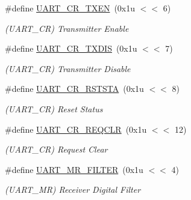 \begin{DoxyCompactItemize}
\#define \mbox{\hyperlink{group__SAMS70__UART_ga8a305762b980c740221e6ead8d8aee87}{U\+A\+R\+T\+\_\+\+C\+R\+\_\+\+T\+X\+EN}}~(0x1u $<$$<$ 6)
\begin{DoxyCompactList}\small\item\em (U\+A\+R\+T\+\_\+\+CR) Transmitter Enable \end{DoxyCompactList}\item 
\mbox{\label{group__SAMS70__UART_gab822b68f656ad659006963366cd63ce1}} 
\#define \mbox{\hyperlink{group__SAMS70__UART_gab822b68f656ad659006963366cd63ce1}{U\+A\+R\+T\+\_\+\+C\+R\+\_\+\+T\+X\+D\+IS}}~(0x1u $<$$<$ 7)
\begin{DoxyCompactList}\small\item\em (U\+A\+R\+T\+\_\+\+CR) Transmitter Disable \end{DoxyCompactList}\item 
\mbox{\label{group__SAMS70__UART_gac3208ecbd03dcec5be5637b0b4e117ab}} 
\#define \mbox{\hyperlink{group__SAMS70__UART_gac3208ecbd03dcec5be5637b0b4e117ab}{U\+A\+R\+T\+\_\+\+C\+R\+\_\+\+R\+S\+T\+S\+TA}}~(0x1u $<$$<$ 8)
\begin{DoxyCompactList}\small\item\em (U\+A\+R\+T\+\_\+\+CR) Reset Status \end{DoxyCompactList}\item 
\mbox{\label{group__SAMS70__UART_gabed6a9339fd23c51f4a9c5106433db94}} 
\#define \mbox{\hyperlink{group__SAMS70__UART_gabed6a9339fd23c51f4a9c5106433db94}{U\+A\+R\+T\+\_\+\+C\+R\+\_\+\+R\+E\+Q\+C\+LR}}~(0x1u $<$$<$ 12)
\begin{DoxyCompactList}\small\item\em (U\+A\+R\+T\+\_\+\+CR) Request Clear \end{DoxyCompactList}\item 
\mbox{\label{group__SAMS70__UART_gafcaf0ef4bfb31afe00020c8b7f15fe05}} 
\#define \mbox{\hyperlink{group__SAMS70__UART_gafcaf0ef4bfb31afe00020c8b7f15fe05}{U\+A\+R\+T\+\_\+\+M\+R\+\_\+\+F\+I\+L\+T\+ER}}~(0x1u $<$$<$ 4)
\begin{DoxyCompactList}\small\item\em (U\+A\+R\+T\+\_\+\+MR) Receiver Digital Filter \end{DoxyCompactList}\item 
$$
\end{DoxyCompactItemize}
